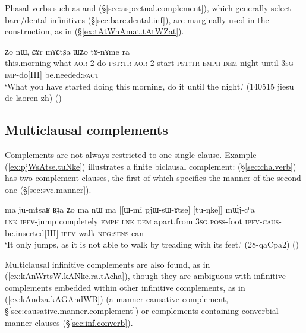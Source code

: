 Phasal verbs such as  and  (§\ref{sec:aspectual.complement}), which generally select bare/dental infinitives (§\ref{sec:bare.dental.inf}), are marginally used in the construction, as in (§\ref{ex:tAtWnAmat.tAtWZat}).  
 
\begin{exe}
\ex \label{ex:tAtWnAmat.tAtWZat}
  ʑo nɯ, ɕɤr mɤɕtʂa ɯʑo tɤ-nɤme ra \\
 this.morning what \textsc{aor}-2-do-\textsc{pst}:\textsc{tr} \textsc{aor}-2-start-\textsc{pst}:\textsc{tr} \textsc{emph} \textsc{dem} night until \textsc{3sg} \textsc{imp}-do[III] be.needed:\textsc{fact} \\
\glt `What you have started doing this morning, do it until the night.' (140515 jiesu de laoren-zh)
()
\end{exe}

\subsection{Multiclausal complements} \label{sec:multiclausal.complements}
Complements are not always restricted to one single clause. Example (\ref{ex:pjWsAtse.tuNke}) illustrates a finite biclausal complement:  (§\ref{sec:cha.verb}) has two complement clauses, the first of which  specifies the manner of the second one (§\ref{sec:svc.manner}).

\begin{exe}
\ex \label{ex:pjWsAtse.tuNke}
\gll ma ju-mtsaʁ ʁɟa ʑo ma nɯ ma [[ɯ-mi pjɯ-sɯ-ɤtse] [tu-ŋke]] mɯ́j-cʰa\\
\textsc{lnk} \textsc{ipfv}-jump completely \textsc{emph} \textsc{lnk} \textsc{dem} apart.from \textsc{3sg}.\textsc{poss}-foot \textsc{ipfv}-\textsc{caus}-be.inserted[III] \textsc{ipfv}-walk \textsc{neg}:\textsc{sens}-can \\
\glt `It only jumps, as it is not able to walk by treading with its feet.'  (28-qaCpa2)
()
\end{exe} 

Multiclausal infinitive complements are also found, as in (\ref{ex:kAnWrtsW.kANke.ra.tAcha}), though they are ambiguous with infinitive complements embedded within other infinitive complements, as in (\ref{ex:kAndza.kAGAndWB}) (a manner causative complement, §\ref{sec:causative.manner.complement}) or complements containing converbial manner clauses (§\ref{sec:inf.converb}).


